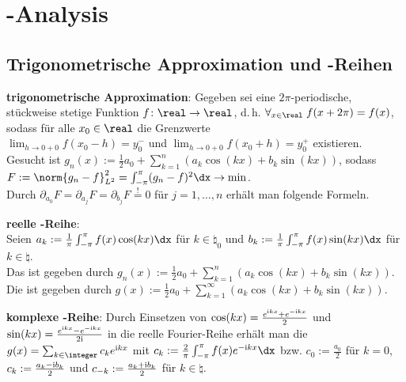 \chapter{%
    -Analysis%
}

\section{%
    Trigonometrische Approximation und -Reihen%
}

\textbf{trigonometrische Approximation}:
Gegeben sei eine $2\pi$-periodische, stückweise stetige Funktion $f\colon \real \to \real$, d.\,h.
$\forall_{x \in \real}\; f(x + 2\pi) = f(x)$, sodass für alle $x_0 \in \real$ die Grenzwerte\\
$\lim_{h \to 0+0} f(x_0 - h) = y_0^-$ und $\lim_{h \to 0+0} f(x_0 + h) = y_0^+$ existieren.\\
Gesucht ist $g_n(x) := \frac{1}{2} a_0 + \sum_{k=1}^n (a_k\cos(kx) + b_k\sin(kx))$, sodass\\
$F := \norm{g_n - f}_{L^2}^2 = \int_{-\pi}^\pi (g_n - f)^2 \dx \to \min$.\\
Durch $\partial_{a_0} F = \partial_{a_j} F = \partial_{b_j} F \overset{!}{=} 0$ für
$j = 1, \dotsc, n$ erhält man folgende Formeln.

\linie

\textbf{reelle -Reihe}:\\
Seien $a_k := \frac{1}{\pi} \int_{-\pi}^\pi f(x)\cos(kx) \dx$ für $k \in \natural_0$
und $b_k := \frac{1}{\pi} \int_{-\pi}^\pi f(x)\sin(kx) \dx$ für $k \in \natural$.\\
Das  ist gegeben durch
$g_n(x) := \frac{1}{2} a_0 + \sum_{k=1}^n (a_k\cos(kx) + b_k\sin(kx))$.\\
Die  ist gegeben durch
$g(x) := \frac{1}{2} a_0 + \sum_{k=1}^\infty (a_k\cos(kx) + b_k\sin(kx))$.

\textbf{komplexe -Reihe}:
Durch Einsetzen von $\cos(kx) = \frac{e^{\text{i} kx} + e^{-\text{i} kx}}{2}$ und
$\sin(kx) = \frac{e^{\text{i} kx} - e^{-\text{i} kx}}{2\text{i}}$ in die reelle Fourier-Reihe erhält man
die  $g(x) = \sum_{k\in\integer} c_k e^{\iu kx}$
mit $c_k := \frac{2}{\pi} \int_{-\pi}^\pi f(x) e^{-\iu kx} \dx$ bzw.
$c_0 := \frac{a_0}{2}$ für $k = 0$,
$c_k := \frac{a_k - \text{i} b_k}{2}$ und $c_{-k} := \frac{a_k + \text{i} b_k}{2}$ für $k \in \natural$.

\linie

